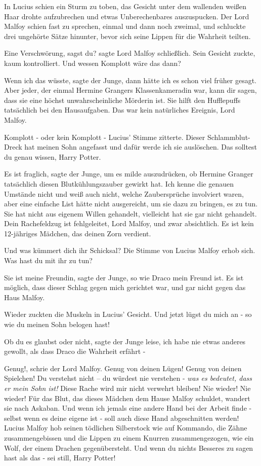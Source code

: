In Lucius schien ein Sturm zu toben, das Gesicht unter dem wallenden weißen Haar
drohte aufzubrechen und etwas Unberechenbares auszuspucken. Der Lord Malfoy
schien fast zu sprechen, einmal und dann noch zweimal, und schluckte drei
ungehörte Sätze hinunter, bevor sich seine Lippen für die Wahrheit teilten.

\glqq{}Eine Verschwörung, sagst du?\grqq{} sagte Lord Malfoy schließlich. Sein
Gesicht zuckte, kaum kontrolliert. \glqq{}Und wessen Komplott wäre das
dann?\grqq{}

\glqq{}Wenn ich das wüsste\grqq{}, sagte der Junge, \glqq{}dann hätte ich es schon
viel früher gesagt. Aber jeder, der einmal Hermine Grangers Klassenkameradin
war, kann dir sagen, dass sie eine höchst unwahrscheinliche Mörderin ist. Sie
hilft den Hufflepuffs tatsächlich bei den Hausaufgaben. Das war kein natürliches
Ereignis, Lord Malfoy.\grqq{}

\glqq{}Komplott - oder kein Komplott -\grqq{} Lucius' Stimme zitterte. \glqq{}
Dieser Schlammblut-Dreck hat meinen Sohn angefasst und dafür werde ich sie
auslöschen. Das solltest du genau wissen, Harry Potter.\grqq{}

\glqq{}Es ist fraglich\grqq{}, sagte der Junge, \glqq{}um es milde auszudrücken,
ob Hermine Granger tatsächlich diesen Blutkühlungszauber gewirkt hat. Ich kenne
die genauen Umstände nicht und weiß auch nicht, welche Zaubersprüche involviert
waren, aber eine einfache List hätte nicht ausgereicht, um sie dazu zu bringen,
es zu tun. Sie hat nicht aus eigenem Willen gehandelt, vielleicht hat sie gar
nicht gehandelt. Dein Rachefeldzug ist fehlgeleitet, Lord Malfoy, und zwar
absichtlich. Es ist kein 12-jähriges Mädchen, das deinen Zorn verdient.\grqq{}

\glqq{}Und was kümmert dich ihr Schicksal?\grqq{} Die Stimme von Lucius Malfoy
erhob sich. \glqq{}Was hast du mit ihr zu tun?\grqq{}

\glqq{}Sie ist meine Freundin\grqq{}, sagte der Junge, \glqq{}so wie Draco mein
Freund ist. Es ist möglich, dass dieser Schlag gegen mich gerichtet war, und gar
nicht gegen das Haus Malfoy.\grqq{}

Wieder zuckten die Muskeln in Lucius' Gesicht. \glqq{}Und jetzt lügst du mich an
- so wie du meinen Sohn belogen hast!\grqq{}

\glqq{}Ob du es glaubst oder nicht\grqq{}, sagte der Junge leise, \glqq{}ich habe
nie etwas anderes gewollt, als dass Draco die Wahrheit erfährt -\grqq{}

\glqq{}Genug!\grqq{}, schrie der Lord Malfoy. \glqq{}Genug von deinen Lügen! Genug
von deinen Spielchen! Du verstehst nicht – du würdest nie verstehen - \emph{was
es bedeutet, dass er mein Sohn ist!} Diese Rache wird mir nicht verwehrt
bleiben! Nie wieder! Nie wieder! Für das Blut, das dieses Mädchen dem Hause
Malfoy schuldet, wandert sie nach Askaban. Und wenn ich jemals eine andere Hand
bei der Arbeit finde - selbst wenn es deine eigene ist - soll auch diese Hand
abgeschnitten werden!\grqq{} Lucius Malfoy hob seinen tödlichen Silberstock wie
auf Kommando, die Zähne zusammengebissen und die Lippen zu einem Knurren
zusammengezogen, wie ein Wolf, der einem Drachen gegenübersteht. \glqq{}Und wenn
du nichts Besseres zu sagen hast als das - sei still, Harry Potter!\grqq{}

